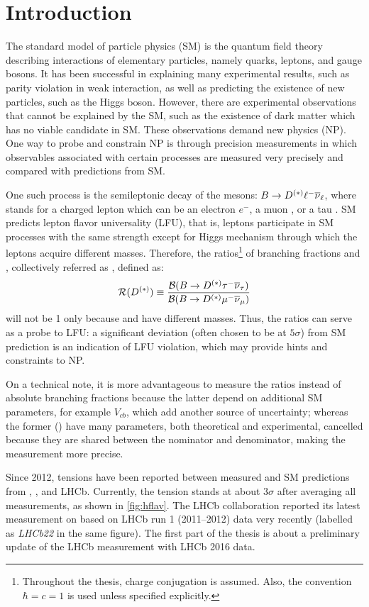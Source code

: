 \chapter{Introduction}
\label{ref:intro}

The standard model of particle physics (SM)
is the quantum field theory describing interactions of elementary particles,
namely quarks, leptons, and gauge bosons.
It has been successful in explaining many experimental results, such as parity
violation in weak interaction,
as well as predicting the existence of new particles, such as the Higgs boson.
However,
there are experimental observations that cannot be explained by the SM,
such as the existence of dark matter
which has no viable candidate in SM.
These observations demand new physics (NP).
One way to probe and constrain NP is through precision measurements
in which observables associated with certain processes are measured very
precisely and compared with predictions from SM.

One such process is the semileptonic decay of the \B mesons:
$B \rightarrow D^{(*)} {\ell^-} {{\overline{\nu}}_\ell}$,
where \ellm stands for a charged lepton which can be an electron $e^-$,
a muon \mun, or a tau \taum.
SM predicts lepton flavor universality (LFU),
that is, leptons participate in SM processes with the same strength
except for Higgs mechanism through which the leptons acquire different masses.
Therefore,
the ratios\footnote{
    Throughout the thesis, charge conjugation is assumed.
    Also, the convention $\hbar = c = 1$ is used unless specified explicitly.
} of branching fractions \RD and \RDst,
collectively referred as \RDX, defined as:
\begin{equation}
    \mathcal{R}(D^{(*)}) \equiv \frac{\mathcal{B}(B \rightarrow D^{(*)} {\tau^-} {{\overline{\nu}}_\tau})}{\mathcal{B}(B \rightarrow D^{(*)} {\mu^-} {{\overline{\nu}}_\mu})}
\end{equation}
will not be 1 only because \taum and \mun have different masses.
Thus, the ratios can serve as a probe to LFU:
a significant deviation (often chosen to be at $5\sigma$) from SM prediction is
an indication of LFU violation,
which may provide hints and constraints to NP.

On a technical note,
it is more advantageous to measure the ratios instead of absolute
branching fractions because the latter depend on additional SM parameters,
for example $V_{cb}$,
which add another source of uncertainty;
whereas the former (\RDX) have many parameters, both theoretical and
experimental, cancelled because they are shared between the nominator and
denominator, making the measurement more precise.

Since 2012, tensions have been reported between measured \RDX and SM
predictions from \babar, \belle, and LHCb.
Currently, the tension stands at about $3 \sigma$ after averaging all
measurements,
as shown in \cref{fig:hflav}.
The LHCb collaboration reported its latest measurement on \RDX based on LHCb run
1 (2011--2012) data very recently
(labelled as \emph{LHCb22} in the same figure).
The first part of the thesis is about a preliminary update of the LHCb \RDX
measurement with LHCb 2016 data.

